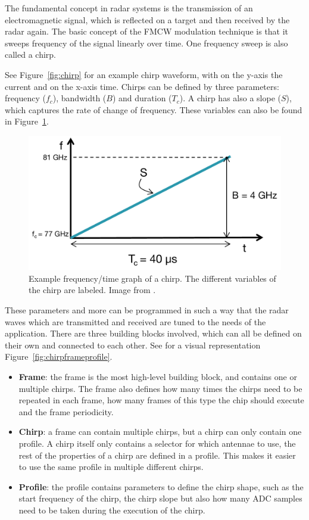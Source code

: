 The fundamental concept in radar systems is the transmission of an electromagnetic signal, which is reflected on a target and then received by the radar again. The basic concept of the FMCW modulation technique is that it sweeps frequency of the signal linearly over time. One frequency sweep is also called a chirp. 

See Figure~\ref{fig:chirp} for an example chirp waveform, with on the y-axis the current and on the x-axis time. Chirps can be defined by three parameters: frequency ($f_c$), bandwidth ($B$) and duration ($T_c$). A chirp has also a slope ($S$), which captures the rate of change of frequency. These variables can also be found in Figure~\ref{fig:chirpfreqtime}.

\begin{figure}[t]
\centering
\includegraphics[width=.6\textwidth]{figures/background/chirp_params.png}
\caption{Example frequency/time graph of a chirp. The different variables of the chirp are labeled. Image from \cite{mmwave_fundamentals_website}.}
\label{fig:chirpfreqtime}
\end{figure}

These parameters and more can be programmed in such a way that the radar waves which are transmitted and received are tuned to the needs of the application. There are three building blocks involved, which can all be defined on their own and connected to each other. See for a visual representation Figure~\ref{fig:chirpframeprofile}.

\begin{itemize}
    \item \textbf{Frame}: the frame is the most high-level building block, and contains one or multiple chirps. The frame also defines how many times the chirps need to be repeated in each frame, how many frames of this type the chip should execute and the frame periodicity.
    \item \textbf{Chirp}: a frame can contain multiple chirps, but a chirp can only contain one profile. A chirp itself only contains a selector for which antennae to use, the rest of the properties of a chirp are defined in a profile. This makes it easier to use the same profile in multiple different chirps.
    \item \textbf{Profile}: the profile contains parameters to define the chirp shape, such as the start frequency of the chirp, the chirp slope but also how many ADC samples need to be taken during the execution of the chirp.
\end{itemize}

